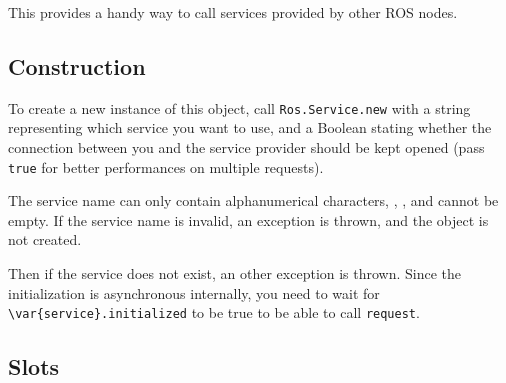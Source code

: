 
This \UObject provides a handy way to call services provided by other ROS
nodes.


\subsection{Construction}

To create a new instance of this object, call \lstinline{Ros.Service.new}
with a string representing which service you want to use, and a Boolean
stating whether the connection between you and the service provider should
be kept opened (pass \lstinline{true} for better performances on multiple
requests).

The service name can only contain alphanumerical characters, \samp{/},
\samp{\_}, and cannot be empty. If the service name is invalid, an exception
is thrown, and the object is not created.

Then if the service does not exist, an other exception is thrown. Since the
initialization is asynchronous internally, you need to wait for
\lstinline|\var{service}.initialized| to be true to be able to call
\lstinline{request}.


\subsection{Slots}

